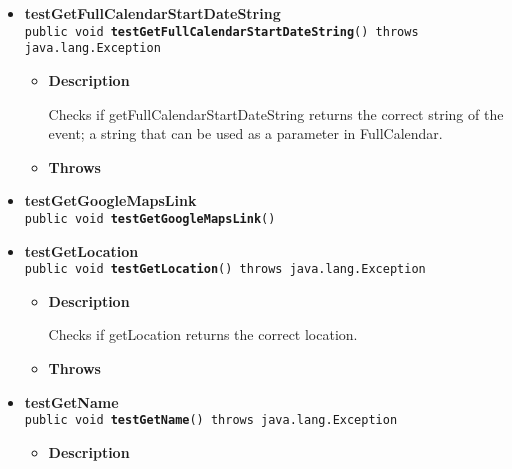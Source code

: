 \documentclass[11pt,a4paper]{report}
\begin{document}
{{{\begin{itemize}
{\begin{itemize}
{Checks if getFullCalendarEndDateString returns the correct string of the event; a string that can be used as a parameter in FullCalendar.
}
\item{{\bf  Throws}
}%
\end{itemize}
}%
\item{ 
{\bf  testGetFullCalendarStartDateString}\\
\texttt{public void\ {\bf  testGetFullCalendarStartDateString}() throws java.lang.Exception
\label{is.mpg.ruglan.test.CalEventTest.testGetFullCalendarStartDateString()}}%
\begin{itemize}
\item{
{\bf  Description}

Checks if getFullCalendarStartDateString returns the correct string of the event; a string that can be used as a parameter in FullCalendar.
}
\item{{\bf  Throws}
}%
\end{itemize}
}%
\item{ 
{\bf  testGetGoogleMapsLink}\\
\texttt{public void\ {\bf  testGetGoogleMapsLink}()
\label{is.mpg.ruglan.test.CalEventTest.testGetGoogleMapsLink()}}%
}%
\item{ 
{\bf  testGetLocation}\\
\texttt{public void\ {\bf  testGetLocation}() throws java.lang.Exception
\label{is.mpg.ruglan.test.CalEventTest.testGetLocation()}}%
\begin{itemize}
\item{
{\bf  Description}

Checks if getLocation returns the correct location.
}
\item{{\bf  Throws}
}%
\end{itemize}
}%
\item{ 
{\bf  testGetName}\\
\texttt{public void\ {\bf  testGetName}() throws java.lang.Exception
\label{is.mpg.ruglan.test.CalEventTest.testGetName()}}%
\begin{itemize}
\item{
{\bf  Description}

}
\end{itemize}}
\end{itemize}}}}
\end{document}
